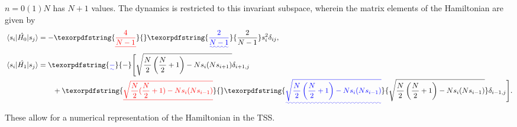 \documentclass[%
reprint,
superscriptaddress,
amsmath,amssymb,
aps,
prb,
showkeys,
]{revtex4-2}
\providecommand{\DIFaddtex}[1]{{\protect\color{blue}\uwave{#1}}} %
\providecommand{\DIFdeltex}[1]{{\protect\color{red}\sout{#1}}}                      %
\providecommand{\DIFaddbegin}{} %
\providecommand{\DIFaddend}{} %
\providecommand{\DIFdelbegin}{} %
\providecommand{\DIFdelend}{} %
\providecommand{\DIFadd}[1]{\texorpdfstring{\DIFaddtex{#1}}{#1}} %
\providecommand{\DIFdel}[1]{\texorpdfstring{\DIFdeltex{#1}}{}} %
\newcommand{\DIFscaledelfig}{0.5}
\newlength{\DIFdelgraphicswidth} %
\newlength{\DIFdelgraphicsheight} %
\newcommand{\DIFaddincludegraphics}[2][]{{\color{blue}\fbox{\DIFOincludegraphics[#1]{#2}}}} %
\newcommand{\DIFdelincludegraphics}[2][]{%
\sbox{\DIFdelgraphicsbox}{\DIFOincludegraphics[#1]{#2}}%
\settoboxwidth{\DIFdelgraphicswidth}{\DIFdelgraphicsbox} %
\settoboxtotalheight{\DIFdelgraphicsheight}{\DIFdelgraphicsbox} %
\scalebox{\DIFscaledelfig}{%
\parbox[b]{\DIFdelgraphicswidth}{\usebox{\DIFdelgraphicsbox}\\[-\baselineskip] \rule{\DIFdelgraphicswidth}{0em}}\llap{\resizebox{\DIFdelgraphicswidth}{\DIFdelgraphicsheight}{%
\setlength{\unitlength}{\DIFdelgraphicswidth}%
\begin{picture}(1,1)%
\thicklines\linethickness{2pt} %
{\color[rgb]{1,0,0}\put(0,0){\framebox(1,1){}}}%
{\color[rgb]{1,0,0}\put(0,0){\line( 1,1){1}}}%
{\color[rgb]{1,0,0}\put(0,1){\line(1,-1){1}}}%
\end{picture}%
}\hspace*{3pt}}} %
} %
\DeclareRobustCommand{\DIFaddbegin}{\DIFOaddbegin \let\includegraphics\DIFaddincludegraphics} %
\DeclareRobustCommand{\DIFaddend}{\DIFOaddend \let\includegraphics\DIFOincludegraphics} %
\DeclareRobustCommand{\DIFdelbegin}{\DIFOdelbegin \let\includegraphics\DIFdelincludegraphics} %
\DeclareRobustCommand{\DIFdelend}{\DIFOaddend \let\includegraphics\DIFOincludegraphics} %
\begin{document}
$n= 0 (1) N$ has $N+1$ values. The dynamics is restricted to this invariant subspace, wherein the matrix elements of the Hamiltonian are given by
\begin{align}
	\mel{s_i}{\hat{H_0}}{s_j} &= -\DIFdelbegin \DIFdel{\frac{4}{N-1} }\DIFdelend \DIFaddbegin \DIFadd{\frac{2}{N-1} }\DIFaddend s^2_i \delta_{ij},\nonumber\\
	\mel{s_i}{\hat{H_1}}{s_j} &= \DIFaddbegin \DIFadd{-}\DIFaddend \Bigg[\sqrt{\frac{N}{2}\left(\frac{N}{2}+1\right) - Ns_i(Ns_{i + 1})}\delta_{i+1, j} \nonumber\\ 
	&\hskip 0.7cm +\DIFdelbegin \DIFdel{\sqrt{\frac{N}{2}(\frac{N}{2}+1) - Ns_i(Ns_{i- 1})}}\DIFdelend \DIFaddbegin \DIFadd{\sqrt{\frac{N}{2}\left(\frac{N}{2}+1\right) - Ns_i(Ns_{i- 1})}}\DIFaddend \delta_{i-1,j}\Bigg].
	\label{eq:lmg:tssham}
\end{align}
These allow for a numerical representation of the Hamiltonian in the TSS.
\end{document}
